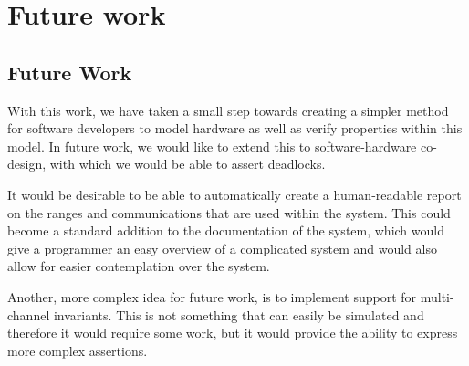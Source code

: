 \chapter{Future work}
\section{Future Work}
With this work, we have taken a small step towards creating a simpler method for software developers to model hardware as well as verify properties within this model. In future work, we would like to extend this to software-hardware co-design, with which we would be able to assert deadlocks.

It would be desirable to be able to automatically create a human-readable report on the ranges and communications that are used within the system. This could become a standard addition to the documentation of the system, which would give a programmer an easy overview of a complicated system and would also allow for easier contemplation over the system.

Another, more complex idea for future work, is to implement support for multi-channel invariants. This is not something that can easily be simulated and therefore it would require some work, but it would provide the ability to express more complex assertions.